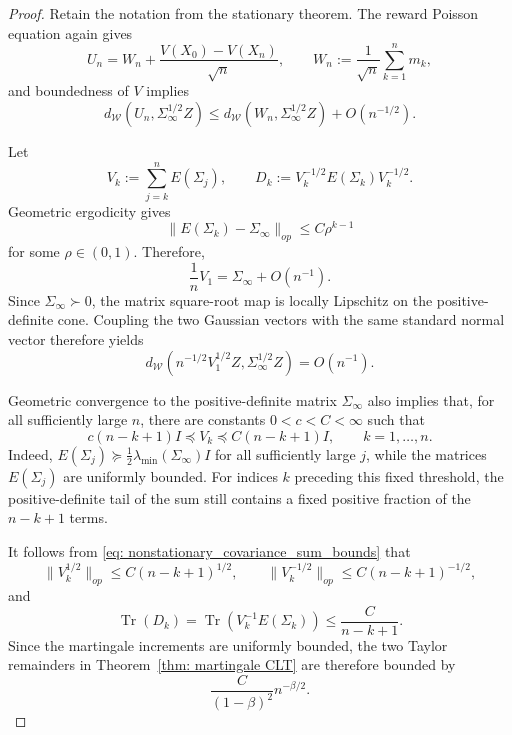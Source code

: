 \documentclass[11pt]{article}
\begin{document}
\begin{proof}
Retain the notation from the stationary theorem. The reward Poisson
equation again gives
\[
U_n=W_n+\frac{V(X_0)-V(X_n)}{\sqrt n},
\qquad
W_n:=\frac1{\sqrt n}\sum_{k=1}^n m_k,
\]
and boundedness of $V$ implies
\[
d_{\mathcal W}(U_n,\Sigma_\infty^{1/2}Z)
\leq
d_{\mathcal W}(W_n,\Sigma_\infty^{1/2}Z)+O(n^{-1/2}).
\]

Let
\[
V_k:=\sum_{j=k}^nE(\Sigma_j),
\qquad
D_k:=V_k^{-1/2}E(\Sigma_k)V_k^{-1/2}.
\]
Geometric ergodicity gives
\[
\|E(\Sigma_k)-\Sigma_\infty\|_{op}
\leq
C\rho^{k-1}
\]
for some $\rho\in(0,1)$. Therefore,
\[
\frac1nV_1
=
\Sigma_\infty+O(n^{-1}).
\]
Since $\Sigma_\infty\succ0$, the matrix square-root map is locally
Lipschitz on the positive-definite cone. Coupling the two Gaussian
vectors with the same standard normal vector therefore yields
\[
d_{\mathcal W}
\left(
n^{-1/2}V_1^{1/2}Z,
\Sigma_\infty^{1/2}Z
\right)
=
O(n^{-1}).
\]

Geometric convergence to the positive-definite matrix
$\Sigma_\infty$ also implies that, for all sufficiently large $n$,
there are constants $0<c<C<\infty$ such that
\begin{equation}
\label{eq: nonstationary_covariance_sum_bounds}
c(n-k+1)I
\preceq
V_k
\preceq
C(n-k+1)I,
\qquad
k=1,\ldots,n.
\end{equation}
Indeed, $E(\Sigma_j)\succeq
\frac12\lambda_{\min}(\Sigma_\infty)I$ for all sufficiently large
$j$, while the matrices $E(\Sigma_j)$ are uniformly bounded. For
indices $k$ preceding this fixed threshold, the positive-definite
tail of the sum still contains a fixed positive fraction of the
$n-k+1$ terms.

It follows from
\eqref{eq: nonstationary_covariance_sum_bounds} that
\[
\|V_k^{1/2}\|_{op}
\leq
C(n-k+1)^{1/2},
\qquad
\|V_k^{-1/2}\|_{op}
\leq
C(n-k+1)^{-1/2},
\]
and
\[
\operatorname{Tr}(D_k)
=
\operatorname{Tr}(V_k^{-1}E(\Sigma_k))
\leq
\frac{C}{n-k+1}.
\]
Since the martingale increments are uniformly bounded, the two
Taylor remainders in Theorem~\ref{thm: martingale CLT} are therefore
bounded by
\[
\frac{C}{(1-\beta)^2}n^{-\beta/2}.
\]


\end{proof}
\end{document}
